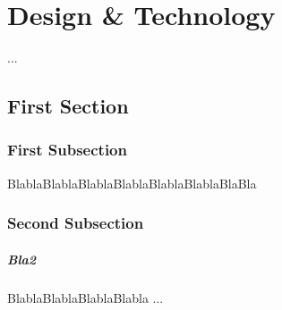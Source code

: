 %

\chapter{Design \& Technology}
\label{Ch:DesignTech}	

...

%
%



\section{First Section }

\subsection{First Subsection}
\label{subsec:DesignA}

BlablaBlablaBlablaBlablaBlablaBlablaBlaBla

%
%



\subsection{Second Subsection}

\paragraph{Bla2} 
BlablaBlablaBlablaBlabla ... 


